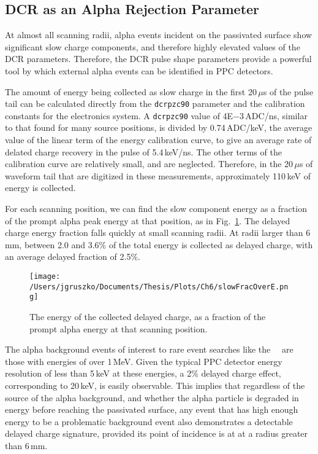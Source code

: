 \subsection{DCR as an Alpha Rejection Parameter}\label{sssec:DCRfit_disc}
At almost all scanning radii, alpha events incident on the passivated surface show significant slow charge components, and therefore highly elevated values of the DCR parameters. Therefore, the DCR pulse shape parameters provide a powerful tool by which external alpha events can be identified in PPC detectors. 

The amount of energy being collected as slow charge in the first 20\,$\mu$s of the pulse tail can be calculated directly from the {\tt dcrpzc90} parameter and the calibration constants for the electronics system. A {\tt dcrpzc90} value of 4E$-3$\,ADC/ns, similar to that found for many source positions, is divided by 0.74\,ADC/keV, the average value of the linear term of the energy calibration curve, to give an average rate of delated charge recovery in the pulse of 5.4\,keV/ns. The other terms of the calibration curve are relatively small, and are neglected. Therefore, in the 20\,$\mu$s of waveform tail that are digitized in these measurements, approximately 110\,keV of energy is collected. 

For each scanning position, we can find the slow component energy as a fraction of the prompt alpha peak energy at that position, as in Fig.~\ref{fig:Efrac}. The delayed charge energy fraction falls quickly at small scanning radii. At radii larger than 6\,mm, between 2.0 and 3.6\% of the total energy is collected as delayed charge, with an average delayed fraction of 2.5\%.  

\begin{figure}[]
 \centering
 \texttt{[image: /Users/jgruszko/Documents/Thesis/Plots/Ch6/slowFracOverE.png]}
 \caption{The energy of the collected delayed charge, as a fraction of the prompt alpha energy at that scanning position.} 
 \label{fig:Efrac}
\end{figure}

The alpha background events of interest to rare event searches like the \MJ\ \DEM\ are those with energies of over 1\,MeV. Given the typical PPC detector energy resolution of less than 5\,keV at these energies, a 2\% delayed charge effect, corresponding to 20\,keV, is easily observable. This implies that regardless of the source of the alpha background, and whether the alpha particle is degraded in energy before reaching the passivated surface, any event that has high enough energy to be a problematic background event also demonstrates a detectable delayed charge signature, provided its point of incidence is at at a radius greater than 6\,mm. 

